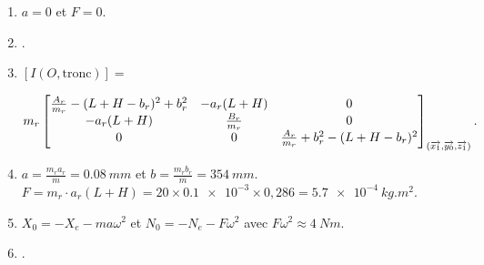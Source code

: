 \documentclass[10pt,fleqn]{article} %
\begin{document}
\begin{multicols}{2}
\begin{enumerate}
\item $a=0$ et $F=0$.

\item .%

\item 
$\left[I(O,\text{tronc})\right]=$

$m_r 
\begin{bmatrix}
\frac{A_r}{m_r}-(L+H-b_r)^2+b_r^2 & -a_r(L+H) & 0 \\ 
-a_r(L+H) & \frac{B_r}{m_r} & 0 \\ 
0 & 0 & \frac{A_r}{m_r}+b_r^2-(L+H-b_r)^2
\end{bmatrix}_{(\overrightarrow{x_1},\overrightarrow{y_0},\overrightarrow{z_1})}.$

\item $a=\frac{m_r a_r}{m}=\SI{0.08}{mm}$ et $b=\frac{m_r b_r}{m}=\SI{354}{mm}$.
 $F=m_r\cdot a_r(L+H)=20\times \num{0,1e-3} \times 0,286=\SI{5.7e-4}{kg.m^2}$. 

\item  $X_0=- X_e - m a \omega^2$  et $N_0=-N_e-F \omega^2$ avec $F \omega^2\approx \SI{4}{Nm}$. 

\item .

\end{enumerate}
\end{multicols}

\newpage
\end{document}
